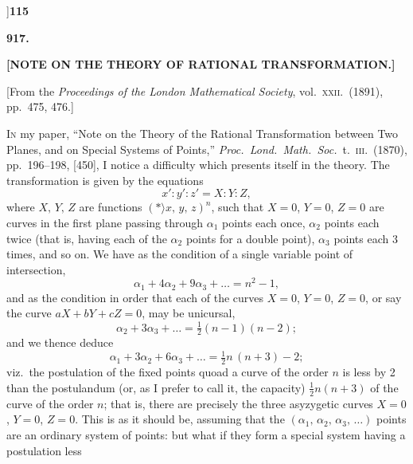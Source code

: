 \documentclass[11pt]{article}
\begin{document}
\newpage
{}]\hfill\hfill\textbf{115}

\vspace{2em}
\begin{center}\large\textbf{917.}\end{center}
\vspace{1em}
\begin{center}\large\textbf{[NOTE ON THE THEORY OF RATIONAL TRANSFORMATION.]}\end{center}
\vspace{0.5em}
\begin{center}\small[From the \emph{Proceedings of the London Mathematical Society},
vol.\ \textsc{xxii}.\ (1891),\\
pp.\ 475, 476.]\end{center}
\vspace{1em}

\hspace{1em} I\textsc{n} my paper, ``Note on the Theory of the Rational
Transformation between Two Planes, and on Special Systems of Points,''
\emph{Proc.\ Lond.\ Math.\ Soc.}\ t.\ \textsc{iii}.\ (1870), pp.\ 196--198,
[450], I notice a difficulty which presents itself in the theory. The
transformation is given by the equations
\[
x':y':z'=X:Y:Z,
\]
where $X,\,Y,\,Z$ are functions $(*\!\!\!\Big\rangle x,\,y,\,z)^{n}$, such
that $X=0$, $Y=0$, $Z=0$ are curves in the first plane passing through
$\alpha_{1}$ points each once, $\alpha_{2}$ points each twice (that is,
having each of the $\alpha_{2}$ points for a double point), $\alpha_{3}$
points each 3 times, and so on. We have as the condition of a single
variable point of intersection,
\[
\alpha_{1}+4\alpha_{2}+9\alpha_{3}+\ldots=n^{2}-1,
\]
and as the condition in order that each of the curves $X=0$, $Y=0$, $Z=0$,
or say the curve $aX+bY+cZ=0$, may be unicursal,
\[
\alpha_{2}+3\alpha_{3}+\ldots=\tfrac{1}{2}(n-1)(n-2);
\]
and we thence deduce
\[
\alpha_{1}+3\alpha_{2}+6\alpha_{3}+\ldots=\tfrac{1}{2}n\,(n+3)-2;
\]
viz.\ the postulation of the fixed points quoad a curve of the order $n$ is
less by 2 than the postulandum (or, as I prefer to call it, the capacity)
$\tfrac{1}{2}n(n+3)$ of the curve of the order $n$; that is, there are
precisely the three asyzygetic curves $X=0$, $Y=0$, $Z=0$. This is as it
should be, assuming that the $(\alpha_{1},\,\alpha_{2},\,\alpha_{3},\,\ldots)$
points are an ordinary system of points: but what if they form a special
system having a postulation less
\end{document}
